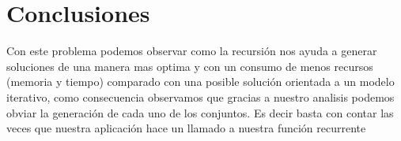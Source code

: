 \documentclass[12pt]{article}
\begin{document}
\section{Conclusiones}
Con este problema podemos observar como la recursi\'on nos ayuda a generar soluciones de una manera mas optima y con un consumo de menos recursos (memoria y tiempo) comparado con una posible soluci\'on orientada a un modelo iterativo, como consecuencia observamos que gracias a nuestro analisis podemos obviar la generaci\'on de cada uno de los conjuntos. Es decir basta con contar las veces que nuestra aplicaci\'on hace un llamado a nuestra funci\'on recurrente 
\end{document}
